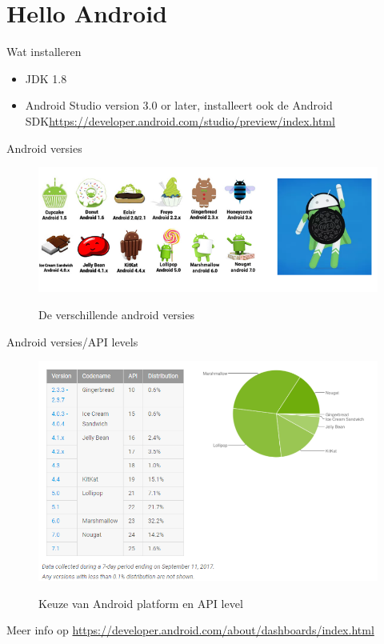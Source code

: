 \documentclass{beamer}
\begin{document}
\section{Hello Android}
\sectionframe{}

\begin{frame}{Wat installeren}
\begin{itemize}

	\item JDK 1.8
	\item Android Studio version 3.0 or later, installeert ook de Android SDK\break \url{https://developer.android.com/studio/preview/index.html}
		\end{itemize}	

\end{frame}

\begin{frame}{Android versies }
\begin{figure}[ht]
	\centering
	\includegraphics[width=\textwidth]{img/hello/android_versies.png}
	\label{fig:android versies}
	\caption{De verschillende android versies}
\end{figure}	
\end{frame}

\begin{frame}{Android versies/API levels }
\begin{figure}[ht]
	\centering
	\includegraphics[width=\textwidth]{img/hello/api_levels.png}
	\label{fig:apilevels}
	\caption{Keuze van Android platform en API level}
\end{figure}
Meer info op \url{https://developer.android.com/about/dashboards/index.html
}	
\end{frame}
\end{document}
